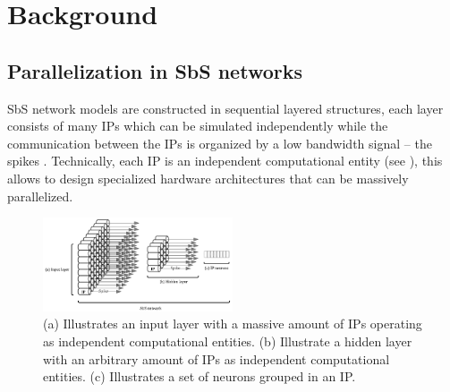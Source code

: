 \section{Background}
\label{sec:background}


\subsection{Parallelization in SbS networks}
SbS network models are constructed in sequential layered structures, each layer consists of many IPs which can be simulated independently while the communication between the IPs is organized by a low bandwidth signal -- the spikes \cite{Rotermund500280}. Technically, each IP is an independent computational entity (see ), this allows to design specialized hardware architectures that can be massively parallelized.

\begin{figure}
	\centering
	\includegraphics[width=0.5\textwidth]{../figures/SbS_layer.pdf}
	\caption{(a) Illustrates an input layer with a massive amount of IPs operating as independent computational entities. (b) Illustrate a hidden layer with an arbitrary amount of IPs as independent computational entities. (c) Illustrates a set of neurons grouped in an IP. }
	\label{fig:SbS_layer}
\end{figure}